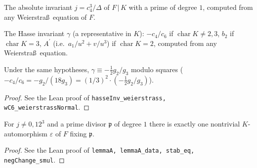 \begin{definition}
\label{def:absolute-invariant}
\leanok
The absolute invariant $j=c_4^3/\Delta$ of $F\,|\,K$ with a prime of degree $1$, computed from any Weierstra\ss\ equation of $F$.
\end{definition}

\begin{definition}
\label{def:hasse-invariant}
\leanok
The Hasse invariant $\gamma$ (a representative in $K$): $-c_4/c_6$ if $\operatorname{char}K\ne2,3$, $b_2$ if $\operatorname{char}K=3$, $A^{\prime}$ (i.e.\ $a_1/u^2+v/u^3$) if $\operatorname{char}K=2$, computed from any Weierstra\ss\ equation.
\end{definition}

\begin{proposition}
\label{prop:hasse-weierstrass}
\leanok
Under the same hypotheses, $\gamma\equiv-\tfrac12g_2/g_3$ modulo squares ($-c_4/c_6=-g_2/(18g_3)=(1/3)^2\cdot(-\tfrac12g_2/g_3)$).
\end{proposition}
\begin{proof}
\leanok
See the Lean proof of \texttt{hasseInv\_weierstrass, wC6\_weierstrassNormal}.
\end{proof}

\begin{lemma}
\label{lem:A}
\leanok
For $j\ne 0,12^3$ and a prime divisor $\mathfrak p$ of degree $1$ there is exactly one nontrivial $K$-automorphism $\varepsilon$ of $F$ fixing $\mathfrak p$.
\end{lemma}
\begin{proof}
\leanok
See the Lean proof of \texttt{lemmaA, lemmaA\_data, stab\_eq, negChange\_smul}.
\end{proof}

